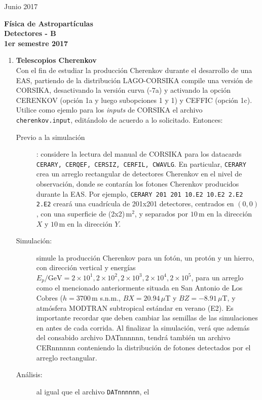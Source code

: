 \documentclass[11pt]{article}
\begin{document}
\pagestyle{empty}
{Junio 2017}
\begin{center}
	{\Large \bf Física de Astropartículas} \\
{ \large \bf Detectores - B} \\ {\bf 1er semestre 2017}
\end{center}

\setcounter{enumi}{0}      %
\begin{enumerate}
	\item {\bf{Telescopios Cherenkov}}\\
		Con el fin de estudiar la producción Cherenkov durante el desarrollo de
		una EAS, partiendo de la distribución LAGO-CORSIKA compile una versión
		de CORSIKA, desactivando la versión curva (-7a) y activando la opción
		CERENKOV (opción 1a y luego subopciones 1 y 1) y CEFFIC (opción 1c).
		Utilice como ejemlo para los {\textit{inputs}} de CORSIKA el archivo
		{\texttt{cherenkov.input}}, editándolo de acuerdo a lo solicitado. Entonces:
		\begin{description}
			\item [Previo a la simulación]: considere la lectura del manual de
				CORSIKA para los datacards {\texttt{CERARY, CERQEF, CERSIZ,
				CERFIL, CWAVLG}}. En particular, {\texttt{CERARY}} crea un arreglo
				rectangular de detectores Cherenkov en el nivel de observación,
				donde se contarán los fotones Cherenkov producidos durante la
				EAS. Por ejemplo, {\texttt{CERARY 201 201 10.E2 10.E2 2.E2
				2.E2}} creará una cuadrícula de 201x201 detectores, centrados
				en $(0,0)$, con una superficie de (2x2)\,m$^2$, y separados por
				$10$\,m en la dirección $X$ y $10$\,m en la dirección $Y$.
			\item [Simulación:] simule la producción Cherenkov para un fotón,
				un protón y un hierro, con dirección vertical y energías
				$E_p/\mathrm{GeV} = 2\times10^1, 2\times10^2, 2\times10^3,
				2\times10^4, 2\times 10^5$, para un arreglo como el mencionado
				anteriormente situada en San Antonio de Los Cobres ($h=3700$\,m
				s.n.m., $BX=20.94$\,$\mu$T y $BZ=-8.91$\,$\mu$T, y atmósfera
				MODTRAN subtropical estándar en verano (E2). Es importante
				recordar que deben cambiar las semillas de las simulaciones en
				antes de cada corrida. Al finalizar la simulación, verá que
				además del consabido archivo DATnnnnnn, tendrá también un
				archivo CERnnnnnn conteniendo la distribución de fotones
				detectados por el arreglo rectangular.
			\item [Análisis:] al igual que el archivo {\texttt{DATnnnnnn}}, el

\end{description}
\end{enumerate}
\end{document}
